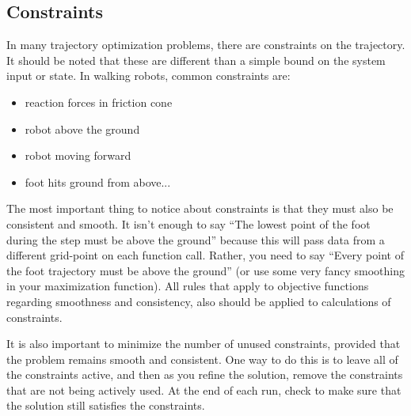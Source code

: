 \subsection{Constraints}

In many trajectory optimization problems, there are constraints on the trajectory. It should be noted that these are different than a simple bound on the system input or state. In walking robots, common constraints are: 

\begin{itemize}
	\item reaction forces in friction cone
	\item robot above the ground
	\item robot moving forward
	\item foot hits ground from above... 
\end{itemize}

The most important thing to notice about constraints is that they must also be consistent and smooth. It isn't enough to say ``The lowest point of the foot during the step must be above the ground'' because this will pass data from a different grid-point on each function call. Rather, you need to say ``Every point of the foot trajectory must be above the ground'' (or use some very fancy smoothing in your maximization function). All rules that apply to objective functions regarding smoothness and consistency, also should be applied to calculations of constraints.

\par It is also important to minimize the number of unused constraints, provided that the problem remains smooth and consistent. One way to do this is to leave all of the constraints active, and then as you refine the solution, remove the constraints that are not being actively used. At the end of each run, check to make sure that the solution still satisfies the constraints.

